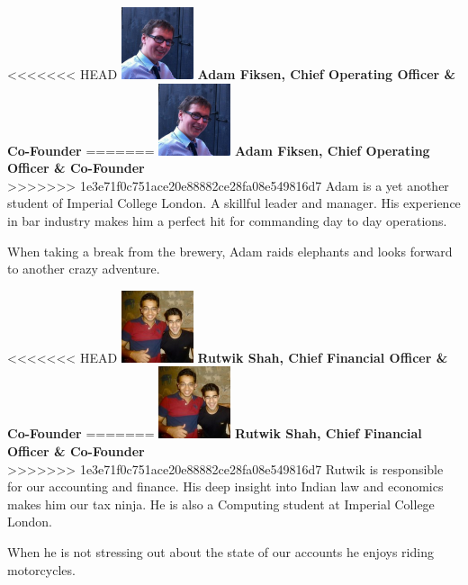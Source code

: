 \documentclass[11pt]{article}
\begin{document}
<<<<<<< HEAD
  \includegraphics[width=80px]{adam.jpg} \textbf{Adam Fiksen, Chief Operating Officer \& Co-Founder}
=======
  \includegraphics[width=80px]{adam.jpg} \textbf{Adam Fiksen, Chief Operating Officer \& Co-Founder}\\
>>>>>>> 1e3e71f0c751ace20e88882ce28fa08e549816d7
  Adam is a yet another student of Imperial College London.
  A skillful leader and manager.
  His experience in bar industry makes him a perfect hit for commanding day to day operations.

  When taking a break from the brewery, Adam raids elephants and looks forward to another crazy adventure.

<<<<<<< HEAD
  \includegraphics[width=80px]{rutwik.jpg} \textbf{Rutwik Shah, Chief Financial Officer \& Co-Founder}
=======
  \includegraphics[width=80px]{rutwik.jpg} \textbf{Rutwik Shah, Chief Financial Officer \& Co-Founder}\\
>>>>>>> 1e3e71f0c751ace20e88882ce28fa08e549816d7
  Rutwik is responsible for our accounting and finance.
  His deep insight into Indian law and economics makes him our tax ninja.
  He is also a Computing student at Imperial College London.

  When he is not stressing out about the state of our accounts he enjoys riding motorcycles.
\end{document}
